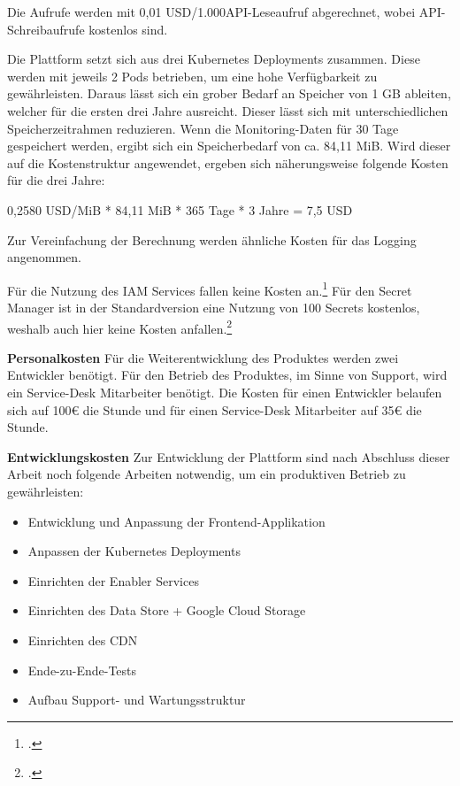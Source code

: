 Die Aufrufe werden mit 0,01 USD/1.000API-Leseaufruf abgerechnet, wobei API-Schreibaufrufe kostenlos sind.

Die Plattform setzt sich aus drei Kubernetes Deployments zusammen.
Diese werden mit jeweils 2 Pods betrieben, um eine hohe Verfügbarkeit zu gewährleisten.
Daraus lässt sich ein grober Bedarf an Speicher von 1 GB ableiten, welcher für die ersten drei Jahre ausreicht.
Dieser lässt sich mit unterschiedlichen Speicherzeitrahmen reduzieren.
Wenn die Monitoring-Daten für 30 Tage gespeichert werden, ergibt sich ein Speicherbedarf von ca. 84,11 MiB.
Wird dieser auf die Kostenstruktur angewendet, ergeben sich näherungsweise folgende Kosten für die drei Jahre:

0,2580 USD/MiB * 84,11 MiB * 365 Tage * 3 Jahre = 7,5 USD

Zur Vereinfachung der Berechnung werden ähnliche Kosten für das Logging angenommen.

Für die Nutzung des IAM Services fallen keine Kosten an.\footcite{GoogleIAMPricing2025}
Für den Secret Manager ist in der Standardversion eine Nutzung von 100 Secrets kostenlos, weshalb auch hier keine Kosten anfallen.\footcite{GoogleSecretManagerPricing2025}

\textbf{Personalkosten}\newline
Für die Weiterentwicklung des Produktes werden zwei Entwickler benötigt.
Für den Betrieb des Produktes, im Sinne von Support, wird ein Service-Desk Mitarbeiter benötigt.
Die Kosten für einen Entwickler belaufen sich auf 100€ die Stunde und für einen Service-Desk Mitarbeiter auf 35€ die Stunde.


\textbf{Entwicklungskosten}\newline
Zur Entwicklung der Plattform sind nach Abschluss dieser Arbeit noch folgende Arbeiten notwendig, um ein produktiven Betrieb zu gewährleisten:
\begin{itemize}
    \item Entwicklung und Anpassung der Frontend-Applikation
    \item Anpassen der Kubernetes Deployments
    \item Einrichten der Enabler Services
    \item Einrichten des Data Store + Google Cloud Storage
    \item Einrichten des CDN
    \item Ende-zu-Ende-Tests
    \item Aufbau Support- und Wartungsstruktur
\end{itemize}

